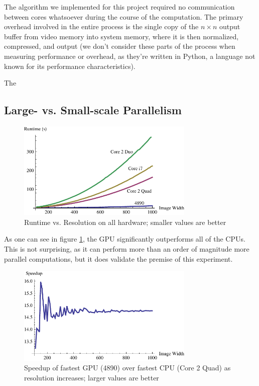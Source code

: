 \documentclass{acmsiggraph}
\begin{document}
The algorithm we implemented for this project required no communication between  cores whatsoever during the course of the computation. The primary overhead involved in the entire process is the single copy of the $n\times n$ output buffer from video memory into system memory, where it is then normalized, compressed, and output (we don't consider these parts of the process when measuring performance or overhead, as they're written in Python, a language not known for its performance characteristics).

The

\subsection{Large- vs. Small-scale Parallelism}

\begin{figure}
    \includegraphics[width=84.5mm]{runtimePlot.pdf}
    \caption{Runtime vs. Resolution on all hardware; smaller values are better}
    \label{fig:runtimePlot}
\end{figure}

As one can see in figure \ref{fig:runtimePlot}, the GPU significantly outperforms all of the CPUs. This is not surprising, as it can perform more than an order of magnitude more parallel computations, but it does validate the premise of this experiment.

\begin{figure}
    \includegraphics[width=84.5mm]{speedupPlot.pdf}
    \caption{Speedup of fastest GPU (4890) over fastest CPU (Core 2 Quad) as resolution increases; larger values are better}
    \label{fig:speedupPlot}
\end{figure}
\end{document}
